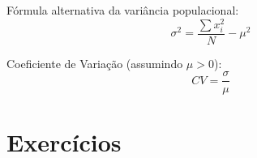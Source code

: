 \documentclass[a4paper]{article}
\begin{document}
Fórmula alternativa da variância populacional:
\begin{displaymath}
  \sigma^2 = \frac{\sum x_i^2}{N} - \mu^2
\end{displaymath}




Coeficiente de Variação (assumindo $\mu > 0$):
\begin{displaymath}
  CV = \frac{\sigma}{\mu}
\end{displaymath}



\section{Exercícios}
\end{document}
